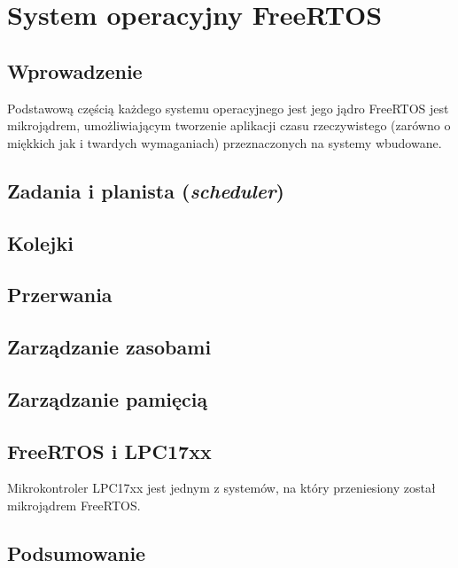 \chapter{System operacyjny FreeRTOS}
\label{cha:freertos}

\section{Wprowadzenie}
\label{sec:rtosWprowadzenie}

Podstawową częścią każdego systemu operacyjnego jest jego jądro
FreeRTOS jest mikrojądrem, umożliwiającym tworzenie aplikacji czasu rzeczywistego (zarówno o miękkich jak i twardych wymaganiach) przeznaczonych na systemy wbudowane. 

\section{Zadania i planista (\emph{scheduler})}
\label{sec:rtosScheduler}

\section{Kolejki}
\label{sec:rtosKolejki}

\section{Przerwania}
\label{sec:rtosPrzerwania}

\section{Zarządzanie zasobami}
\label{sec:rtosZasoby}

\section{Zarządzanie pamięcią}
\label{sec:rtosPamiec}

\section{FreeRTOS i LPC17xx}
\label{sec:rtosLPC}

Mikrokontroler LPC17xx jest jednym z systemów, na który przeniesiony został mikrojądrem FreeRTOS.

\section{Podsumowanie}
\label{sec:rtosPodsumowanie}